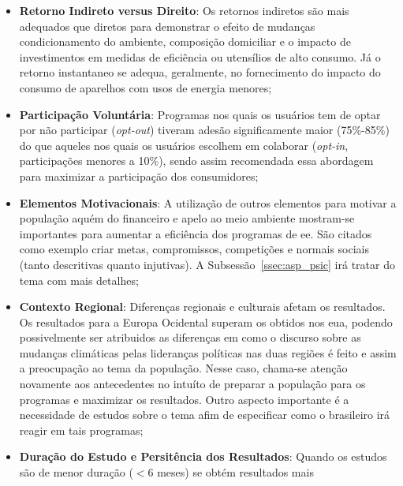 \begin{itemize}
\item \textbf{Retorno Indireto versus Direito}: 
Os retornos indiretos são mais adequados que diretos 
para demonstrar o efeito de mudanças condicionamento do ambiente, 
composição domiciliar e o impacto de investimentos 
em medidas de eficiência ou utensílios de alto consumo. Já o retorno instantaneo 
se adequa, geralmente, no fornecimento do impacto do consumo de aparelhos com 
usos de energia menores;
\item \textbf{Participação Voluntária}: Programas nos quais os usuários tem de
optar por não participar (\emph{opt-out}) tiveram adesão significamente 
maior (75\%-85\%) do que aqueles nos quais os usuários escolhem em colaborar
(\emph{opt-in}, participações menores a 10\%), sendo assim recomendada essa 
abordagem para maximizar a participação dos consumidores;
\item \textbf{Elementos Motivacionais}: A utilização de outros elementos para
motivar a população aquém do financeiro e apelo ao meio ambiente mostram-se 
importantes para aumentar a eficiência dos programas de \gls{ee}. São citados
como exemplo criar metas, compromissos, competições e normais sociais 
(tanto descritivas quanto injutivas). A Subsessão~\ref{ssec:asp_psic} 
irá tratar do tema com mais detalhes;
\item \textbf{Contexto Regional}: Diferenças regionais e culturais afetam os 
resultados. Os resultados para a Europa Ocidental superam os obtidos nos
\gls{eua}, podendo possivelmente ser atribuidos as diferenças em como o 
discurso sobre as mudanças climáticas pelas lideranças políticas nas duas regiões 
é feito e assim a preocupação ao tema da população. Nesse caso, chama-se atenção
novamente aos antecedentes no intuíto de preparar a população para os programas e
maximizar os resultados. Outro aspecto importante é a necessidade de estudos
sobre o tema afim de especificar como o brasileiro irá reagir em tais programas;
\item \textbf{Duração do Estudo e Persitência dos Resultados}: Quando os 
estudos são de menor duração ($< 6$ meses) se obtém resultados mais 

\end{itemize}
